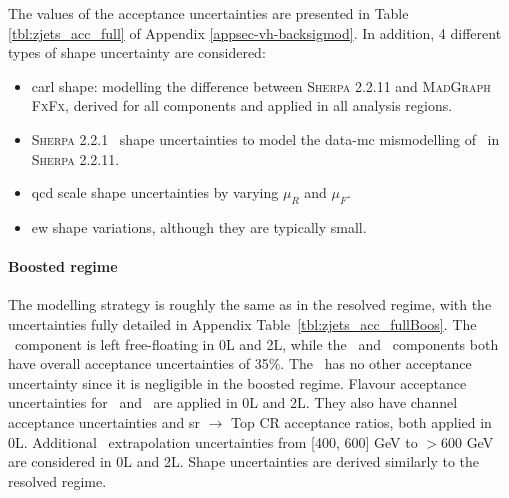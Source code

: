 The values of the acceptance uncertainties are presented in Table \ref{tbl:zjets_acc_full} of Appendix \ref{appsec-vh-backsigmod}. In addition, 4 different types of shape uncertainty are considered:
\begin{itemize}
    \item \gls{carl} shape: modelling the difference between \textsc{Sherpa} 2.2.11 and \textsc{MadGraph FxFx}, derived for all components and applied in all analysis regions.
    \item \textsc{Sherpa} 2.2.1 \ptv\ shape uncertainties to model the data-\gls{mc} mismodelling of \ptv\ in \textsc{Sherpa} 2.2.11. 
    \item \gls{qcd} scale shape uncertainties by varying $\mu_R$ and $\mu_F$.
    \item \gls{ew} shape variations, although they are typically small.
\end{itemize} 

\paragraph{Boosted regime} The modelling strategy is roughly the same as in the resolved regime, with the uncertainties fully detailed in Appendix Table~\ref{tbl:zjets_acc_fullBoos}. The \zhf\ component is left free-floating in 0L and 2L, while the \zmf\ and \zlf\ components both have overall acceptance uncertainties of 35\%. The \zlf\ has no other acceptance uncertainty since it is negligible in the boosted regime. Flavour acceptance uncertainties for \zhf\ and \zmf\ are applied in 0L and 2L. They also have channel acceptance uncertainties and \gls{sr} $\rightarrow$ Top CR acceptance ratios, both applied in 0L. Additional \ptv\ extrapolation uncertainties from [400, 600] GeV to $> 600$ GeV are considered in 0L and 2L. Shape uncertainties are derived similarly to the resolved regime. 

